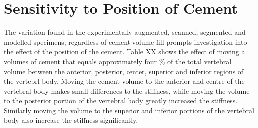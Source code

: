 \documentclass[11pt,a4paper]{article}
\begin{document}
\section{Sensitivity to Position of Cement}

The variation found in the experimentally augmented, scanned, segmented and modelled specimens, regardless of cement volume fill prompts investigation into the effect of the position of the cement.
Table XX shows the effect of moving a volumes of cement that equals approximately four \% of the total vertebral volume between the anterior, posterior, center, superior and inferior regions of the vertebrl body.
Moving the cement volume to the anterior and centre of the vertebral body makes small differences to the stiffness, while moving the volume to the posterior portion of the vertebral body greatly increased the stiffness.
Similarly moving the volume to the superior and inferior portions of the vertebral body also increase the stiffness significantly.
\end{document}
